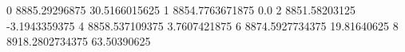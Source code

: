 0 8885.29296875 30.5166015625
1 8854.7763671875 0.0
2 8851.58203125 -3.1943359375
4 8858.537109375 3.7607421875
6 8874.5927734375 19.81640625
8 8918.2802734375 63.50390625
